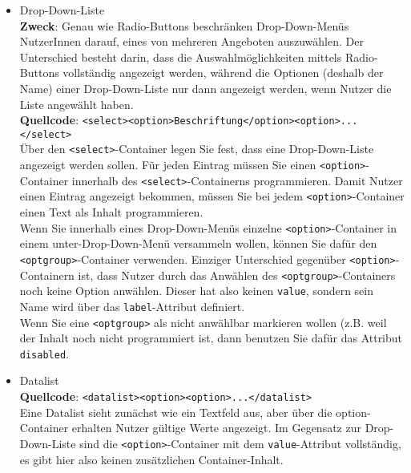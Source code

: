 \begin{itemize}
	\item Drop-Down-Liste\\

	\textbf{Zweck}: Genau wie Radio-Buttons beschränken Drop-Down-Menüs NutzerInnen darauf, eines von mehreren Angeboten auszuwählen. Der Unterschied besteht darin, dass die Auswahlmöglichkeiten mittels Radio-Buttons vollständig angezeigt werden, während die Optionen (deshalb der Name) einer Drop-Down-Liste nur dann angezeigt werden, wenn Nutzer die Liste angewählt haben.\\
	
	\textbf{Quellcode}: \verb|<select><option>Beschriftung</option><option>...</select>|\\

	Über den \verb|<select>|-Container legen Sie fest, dass eine Drop-Down-Liste angezeigt werden sollen. Für jeden Eintrag müssen Sie einen \verb|<option>|-Container innerhalb des \verb|<select>|-Containerns programmieren. Damit Nutzer einen Eintrag angezeigt bekommen, müssen Sie bei jedem \verb|<option>|-Container einen Text als Inhalt programmieren.\\

	Wenn Sie innerhalb eines Drop-Down-Menüs einzelne \verb|<option>|-Container in einem unter-Drop-Down-Menü versammeln wollen, können Sie dafür den \verb|<optgroup>|-Container verwenden. Einziger Unterschied gegenüber \verb|<option>|-Containern ist, dass Nutzer durch das Anwählen des \verb|<optgroup>|-Containers noch keine Option anwählen. Dieser hat also keinen \verb|value|, sondern sein Name wird über das \verb|label|-Attribut definiert.\\

	Wenn Sie eine \verb|<optgroup>| als nicht anwählbar markieren wollen (z.B. weil der Inhalt noch nicht programmiert ist, dann benutzen Sie dafür das Attribut \verb|disabled|.\\

	\item Datalist\\

	\textbf{Quellcode}: \verb|<datalist><option><option>...</datalist>|\\

	Eine Datalist sieht zunächst wie ein Textfeld aus, aber über die option-Container erhalten Nutzer gültige Werte angezeigt. Im Gegensatz zur Drop-Down-Liste sind die \verb|<option>|-Container mit dem \verb|value|-Attribut vollständig, es gibt hier also keinen zusätzlichen Container-Inhalt.\\


\end{itemize}
